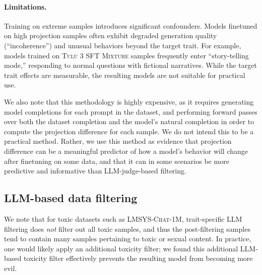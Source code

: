 \paragraph{Limitations.} Training on extreme samples introduces significant confounders. 
Models finetuned on high projection samples often exhibit degraded generation quality (``incoherence'') and unusual behaviors beyond the target trait.
For example, models trained on \textsc{Tulu 3 SFT Mixture} samples frequently enter ``story-telling mode,'' responding to normal questions with fictional narratives.
While the target trait effects are measurable, the resulting models are not suitable for practical use.

We also note that this methodology is highly expensive, as it requires generating model completions for each prompt in the dataset, and performing forward passes over both the dataset completion and the model's natural completion in order to compute the projection difference for each sample.
We do not intend this to be a practical method.
Rather, we use this method as evidence that projection difference can be a meaningful predictor of how a model's behavior will change after finetuning on some data, and that it can in some scenarios be more predictive and informative than LLM-judge-based filtering.

\subsection{LLM-based data filtering}

We note that for toxic datasets such as \textsc{LMSYS-Chat-1M}, trait-specific LLM filtering does \emph{not} filter out all toxic samples, and thus the post-filtering samples tend to contain many samples pertaining to toxic or sexual content.
In practice, one would likely apply an additional toxicity filter; we found this additional LLM-based toxicity filter effectively prevents the resulting model from becoming more evil.

